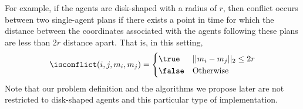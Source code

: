 For example, if the agents are disk-shaped with a radius of $r$, then conflict occurs between two single-agent plans if there exists a point in time for which the distance between the coordinates associated with the agents following these plans are less than $2r$ distance apart. 
That is, in this setting, 
\begin{equation}
\isconflict(i,j, m_i,m_j)=
\begin{cases}
\true & ||m_i-m_j||_2\leq 2r \\
\false & \text{Otherwise}
\end{cases}
\end{equation}
Note that our problem definition and the algorithms we propose later are not restricted to disk-shaped agents and this particular type of \isconflict implementation. 
